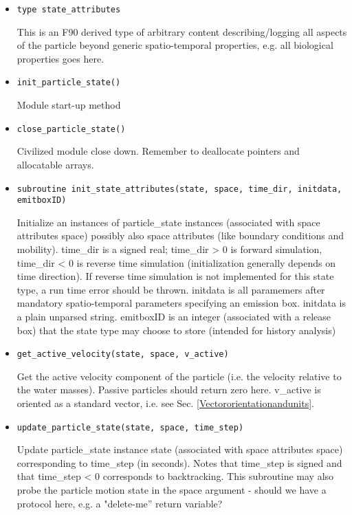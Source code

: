 \begin{itemize}

\item {\tt  type state\_attributes }

This is an F90 derived type of arbitrary content
describing/logging all aspects of the particle beyond
generic spatio-temporal properties, e.g. all biological
properties goes here.

\item {\tt  init\_particle\_state() }  

Module start-up method

\item {\tt  close\_particle\_state()}  

Civilized module close down. Remember to deallocate 
pointers and allocatable arrays.

\item {\tt  subroutine init\_state\_attributes(state, space, time\_dir,             
      initdata, emitboxID)} 

Initialize an instances of particle\_state instances 
(associated with space attributes space) possibly also space attributes
(like boundary conditions and mobility). time\_dir is a signed real;
time\_dir > 0 is forward simulation, time\_dir < 0 is reverse time
simulation (initialization generally depends on time direction).
If reverse time simulation is not implemented for this state type,
a run time error should be thrown.
initdata is all paramemers after mandatory spatio-temporal parameters
specifying an emission box. initdata is a plain unparsed string.
emitboxID is an integer (associated with a release box) that the
state type may choose to store (intended for history analysis)



\item {\tt  get\_active\_velocity(state, space, v\_active)} 

Get the active velocity component of the particle (i.e. the velocity relative
to the water masses). Passive particles should return zero here.
v\_active is oriented as a standard vector, i.e. 
see Sec. \ref{Vectororientationandunits}.

\item {\tt  update\_particle\_state(state, space, time\_step)} 

Update particle\_state instance state (associated with space attributes
space) corresponding to time\_step (in seconds). Notes that
time\_step is signed and that time\_step < 0 corresponds to backtracking.
This subroutine may also probe the particle motion state in the 
space argument - should we have a protocol here, e.g. a "delete-me''
return variable?


\end{itemize}
